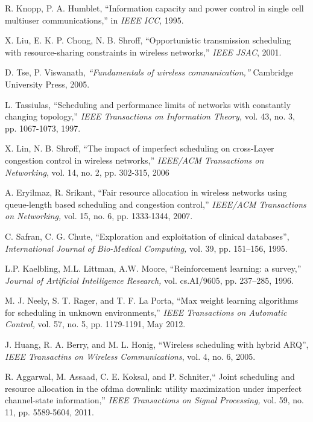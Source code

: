 \documentclass[11pt,twocolumn]{IEEEtran}
\begin{document}
\begin{thebibliography}{1}

\vspace{3pt}
R. Knopp, P. A. Humblet, ``Information capacity and power control
in single cell multiuser communications,'' in \emph{IEEE ICC}, 1995.

X. Liu, E. K. P. Chong, N. B. Shroff, ``Opportunistic transmission scheduling with resource-sharing constraints in wireless networks,'' \emph{IEEE JSAC}, 2001.

D. Tse, P. Viswanath, \emph{``Fundamentals of wireless
communication,''} Cambridge University Press, 2005.

L. Tassiulas, ``Scheduling and performance limits of networks with constantly changing topology,'' \emph{IEEE Transactions on Information Theory,} vol. 43, no. 3, pp. 1067-1073, 1997.

X. Lin, N. B. Shroff, ``The impact of imperfect scheduling on cross-Layer congestion control in wireless networks,'' \emph{IEEE/ACM Transactions on Networking}, vol. 14, no. 2, pp. 302-315, 2006

A. Eryilmaz, R. Srikant, ``Fair resource allocation in wireless networks using queue-length based scheduling and congestion control,'' \emph{IEEE/ACM Transactions on Networking,} vol. 15, no. 6, pp. 1333-1344, 2007.

C. Safran, C. G. Chute, ``Exploration and exploitation of clinical databases'', \emph{International Journal of Bio-Medical Computing,} vol. 39, pp. 151--156, 1995.

L.P. Kaelbling, M.L. Littman, A.W. Moore, ``Reinforcement
learning: a survey,''  \emph{Journal of Artificial Intelligence Research,} vol. cs.AI/9605, pp. 237--285, 1996.

M. J. Neely, S. T. Rager, and T. F. La Porta, ``Max weight learning algorithms for
scheduling in unknown environments,'' \emph{IEEE Transactions on Automatic Control,} vol. 57, no. 5, pp. 1179-1191, May 2012.

J. Huang, R. A. Berry, and M. L. Honig, ``Wireless scheduling with hybrid ARQ'', \emph{IEEE Transactins on Wireless Communications}, vol. 4, no. 6, 2005.

R. Aggarwal, M. Assaad, C. E. Koksal, and P. Schniter,`` Joint scheduling and resource allocation in the ofdma downlink: utility maximization under imperfect channel-state information,'' \emph{IEEE Transactions on Signal Processing,} vol. 59, no. 11, pp. 5589-5604, 2011.


\end{thebibliography}
\end{document}
